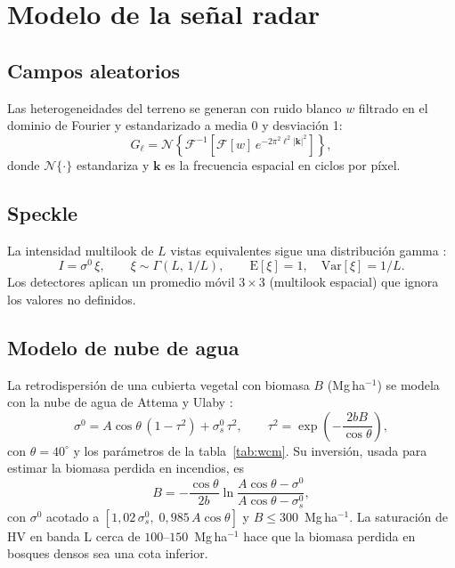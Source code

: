 \documentclass[11pt,a4paper]{article}
\newcommand{\vect}[1]{\mathbf{#1}}
\begin{document}
\section{Modelo de la señal radar}

\subsection{Campos aleatorios}
Las heterogeneidades del terreno se generan con ruido blanco $w$ filtrado en el dominio de Fourier y
estandarizado a media 0 y desviación 1:
\begin{equation}\label{eq:campo}
  G_\ell = \mathcal{N}\!\left\{\mathcal F^{-1}\!\left[\mathcal F[w]\, e^{-2\pi^2\ell^2|\vect k|^2}\right]\right\},
\end{equation}
donde $\mathcal N\{\cdot\}$ estandariza y $\vect k$ es la frecuencia espacial en ciclos por píxel.

\subsection{Speckle}
La intensidad multilook de $L$ vistas equivalentes sigue una distribución gamma \cite{goodman1976}:
\begin{equation}
  I = \sigma^0\,\xi,\qquad \xi\sim\Gamma\!\left(L,\, 1/L\right),\qquad \mathrm{E}[\xi]=1,\quad \mathrm{Var}[\xi]=1/L.
\end{equation}
Los detectores aplican un promedio móvil $3\times3$ (multilook espacial) que ignora los valores no
definidos.

\subsection{Modelo de nube de agua}
La retrodispersión de una cubierta vegetal con biomasa $B$ (Mg\,ha$^{-1}$) se modela con la nube de agua
de Attema y Ulaby \cite{attema1978}:
\begin{equation}\label{eq:wcm}
  \sigma^0 = A\cos\theta\,(1-\tau^2) + \sigma^0_{s}\,\tau^2,\qquad \tau^2 = \exp\!\left(-\frac{2bB}{\cos\theta}\right),
\end{equation}
con $\theta = 40^\circ$ y los parámetros de la tabla~\ref{tab:wcm}. Su inversión, usada para estimar la
biomasa perdida en incendios, es
\begin{equation}
  B = -\frac{\cos\theta}{2b}\ln\frac{A\cos\theta-\sigma^0}{A\cos\theta-\sigma^0_s},
\end{equation}
con $\sigma^0$ acotado a $[1{,}02\,\sigma^0_s,\; 0{,}985\,A\cos\theta]$ y $B\le 300$~Mg\,ha$^{-1}$. La saturación
de HV en banda L cerca de $100$--$150$~Mg\,ha$^{-1}$ hace que la biomasa perdida en bosques densos sea una
cota inferior.
\end{document}
